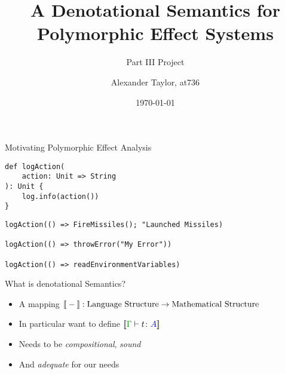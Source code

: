 \documentclass{beamer}
\title{A Denotational Semantics for Polymorphic Effect Systems}
\subtitle{Part III Project}
\author{Alexander Taylor, at736}
\institute{University of Cambridge}
\date{\today}
\newcommand\script[1]{}
\begin{document}
\begin{frame}
    \titlepage
\end{frame}

\begin{frame}[fragile]{Motivating Polymorphic Effect Analysis}    

\begin{verbatim}
def logAction(
    action: Unit => String
): Unit {
    log.info(action())
}  
\end{verbatim}

\begin{verbatim}
logAction(() => FireMissiles(); "Launched Missiles)

logAction(() => throwError("My Error"))

logAction(() => readEnvironmentVariables)
\end{verbatim}

    \script{
        - Imagine you're a compiler trying to analyse the side effects of this \texttt{doAction} function here.

        - You're not having the best of times
        - it's used three times with three different side effect - one's irrevocable - you can't speculatively execute it, one alters control flow, and the last accesses immutable state so you can do all sorts of optimisations.
        
        - Using some simple  analysis, you can create three separate instantiations of the function to analyse, so it's not too difficult in this case.
        - However in programs with higher order functions, creating these separate instantiations is undecidable in general

        - With a polymorphic effect system, it becomes a bit easier to analyse programs like this. But how do you know that your tools and optimisations are sound?
    }
\end{frame}

\begin{frame}{What is denotational Semantics? }
    \begin{itemize}
        \item A mapping ${\bf [\![}-{\bf ]\!]}: \text{Language Structure} \rightarrow \text{Mathematical Structure}$
        \item In particular want to define $\deno{\gtyperelation{t}{A}}$
        \item Needs to be \textit{compositional}, \textit{sound}
        \item And \textit{adequate} for our needs
    \end{itemize}

    \script{
        - Denotational semantics is where we create a mapping between program terms and an abstract mathematical structure.
        - We want this to be compositional - meaning that each term's denotation is defined in terms of its subterms 
        - It should also be sound, meaning that equivalent program terms up-for, for example, beta-eta reduction, have equal denotations.
        - we also want it to be adequate - if two terms have equal denotations, then that should mean something useful about the relation of the two terms (e.g. can replace one by the other, etc)
    }
\end{frame}
\end{document}
